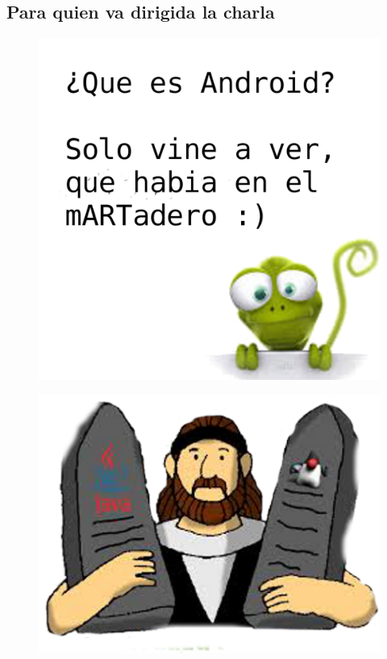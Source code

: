 \documentclass[12pt]{beamer} %
\begin{document}
\subsection{Para quien va dirigida la charla}
\begin{slide}
 
  \begin{figure}[h]
      \includegraphics[height=0.9\textheight]{img/camaleon.png}
  \end{figure}
\end{slide}

\begin{slide}
  \begin{figure}[h]
      \includegraphics[height=0.9\textheight]{img/javas.png}
    \end{figure}
\end{slide}
\end{document}
